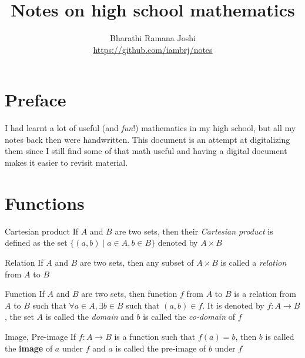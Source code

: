\documentclass[titlepage, 12pt]{book}
\begin{document}
\title{Notes on high school mathematics}
\author{Bharathi Ramana Joshi\\\url{https://github.com/iambrj/notes}}
\maketitle

\tableofcontents

\chapter*{Preface}

I had learnt a lot of useful (and \textit{fun}!) mathematics in my high school,
but all my notes back then were handwritten. This document is an attempt at
digitalizing them since I still find some of that math useful and having a
digital document makes it easier to revisit material.

\chapter{Functions}
\begin{definition}{Cartesian product}{}
    If $A$ and $B$ are two sets, then their \textit{Cartesian product} is
    defined as the set $\{(a, b)\mid a\in A,b\in B\}$ denoted by $A\times B$
\end{definition}

\begin{definition}{Relation}{}
    If $A$ and $B$ are two sets, then any subset of $A\times B$ is called a
    \textit{relation} from $A$ to $B$
\end{definition}

\begin{definition}{Function}{}
    If $A$ and $B$ are two sets, then function $f$ from $A$ to $B$ is a relation
    from $A$ to $B$ such that $\forall a\in A,\exists b\in B$ such that $(a,
    b)\in f$. It is denoted by $f:A\rightarrow B$, the set $A$ is called the
    \textit{domain} and $b$ is called the \textit{co-domain} of $f$
\end{definition}

\begin{definition}{Image, Pre-image}{}
    If $f:A\rightarrow B$ is a function such that $f(a) = b$, then $b$ is called
    the \textbf{image} of $a$ under $f$ and $a$ is called the pre-image of $b$
    under $f$
\end{definition}
\end{document}
